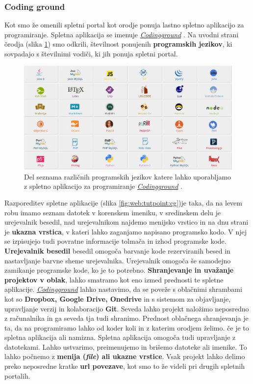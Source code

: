 \subsubsection{Coding ground}
\label{sec:coding_ground}

Kot smo že omenili spletni portal kot orodje ponuja lastno spletno
aplikacijo za programiranje. Spletna aplikacija se imenuje
\emph{\href{http://www.tutorialspoint.com/codingground.htm}{Codingground}}
\cite{web:tutorialspoint:codingground}. Na uvodni strani õrodja (slika
\ref{fig:web:tutpoint:cg-pl}) smo odkrili, številnost ponujenih
\textbf{programskih jezikov}, ki sovpadajo s številnimi vodiči, ki jih
ponuja spletni portal.

\begin{figure}[h!]
  \centering
    \includegraphics [width=0.65\linewidth, keepaspectratio =
   1] {./images/sc_web/tutpoint_cg-pl-v01.png}
   \caption{Del seznama različnih programskih jezikov katere lahko
     uporabljamo z spletno aplikacijo za programiranje
     \emph{\href{http://www.tutorialspoint.com/codingground.htm}{Codingground}}
     \cite{web:tutorialspoint:codingground}.}
    \label{fig:web:tutpoint:cg-pl}
\end{figure}

Razporeditev spletne aplikacije (slika \ref{fig:web:tutpoint:cg})je
taka, da na levem robu imamo seznam datotek v korenskem imeniku, v
sredinskem delu je urejevalnik besedil, nad urejevalnikom najdemo
menijsko vrstico in na dnu strani je \textbf{ukazna vrstica}, v kateri
lahko zaganjamo napisano programsko kodo. V njej se izpisujejo tudi
povratne informacije tolmača in izhod programske
kode. \textbf{Urejevalnik besedil} besedil omogoča barvanje kode
rezerviranih besed in nastavljanje barvne sheme
urejevalnika. Urejevalnik omogoča še samodejno zamikanje programske
kode, ko je to potrebno. \textbf{Shranjevanje in uvažanje projektov v
  oblak}, lahko smatramo kot eno izmed prednosti te spletne
aplikacije. \emph{\href{http://www.tutorialspoint.com/codingground.htm}{Codingground}}
lahko nastavimo, da se poveže s oblačnimi shrambami kot so
\textbf{Dropbox, Google Drive, Onedrive} in s sistemom za objavljanje,
upravljanje verzij in kolaboracijo \textbf{Git}. Seveda lahko projekt
naložimo neposredno z računalnika in ga seveda tja tudi
shranimo. Prednost oblačnega shranjevanja je ta, da na programiramo
lahko od koder koli in z katerim orodjem želimo. če je to spletna
aplikacija ali namizna. Spletna aplikacija omogoča tudi upravljanje z
datotekami. Lahko ustvarimo, preimenujemo in brišemo datoteke ali
imenike. To lahko počnemo z \textbf{menija (\emph{file}) ali ukazne
  vrstice}. Vsak projekt lahko delimo preko neposredne kratke
\textbf{url povezave}, kot smo to že videli pri drugih spletnih
portalih.


